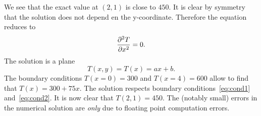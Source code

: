 \FloatBarrier

We see that the exact value at $(2,1)$ is close to $450$. It is clear by symmetry that the solution does not depend en the y-coordinate. Therefore the equation reduces to $$\dfrac{\partial^{2} T}{\partial x^{2}}=0.$$
The solution is a plane $$T(x,y)=T(x)= ax+b.$$ 
The boundary conditions $T(x=0)=300$ and $T(x=4)=600$ allow to find that $T(x)= 300+ 75x$. The solution respects boundary conditions~\eqref{eq:cond1} and~\eqref{eq:cond2}. It is now clear that $T(2,1)=450$. The (notably small) errors in the numerical solution are \textit{only} due to floating point computation errors. 
